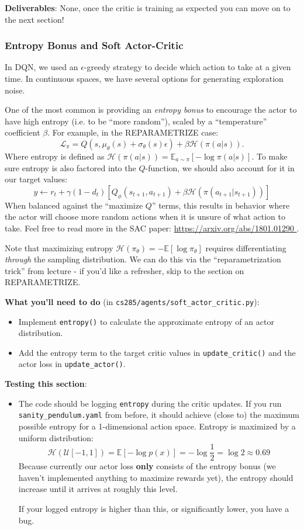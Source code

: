 \textbf{Deliverables}: None, once the critic is training as expected you can move on to the next section!

\subsubsection{Entropy Bonus and Soft Actor-Critic}
In DQN, we used an $\epsilon$-greedy strategy to decide which action to take at a given time. In continuous spaces, we have several options for generating exploration noise.

One of the most common is providing an \textit{entropy bonus} to encourage the actor to have high entropy (i.e. to be ``more random''), scaled by a ``temperature'' coefficient $\beta$. For example, in the REPARAMETRIZE case:
\[\mathcal L_\pi = Q(s, \mu_\theta(s) + \sigma_\theta(s)\epsilon) + \beta\mathcal{H}(\pi(a|s)).\]
Where entropy is defined as $\mathcal H(\pi(a|s)) = \mathbb{E}_{a \sim \pi}\left[-\log\pi(a|s)\right]$. To make sure entropy is also factored into the $Q$-function, we should also account for it in our target values:
\[y \gets r_t + \gamma(1-d_t)\left[Q_\phi(s_{t+1}, a_{t+1}) + \beta\mathcal{H}(\pi(a_{t+1}|s_{t+1}))\right]\]
When balanced against the ``maximize $Q$'' terms, this results in behavior where the actor will choose more random actions when it is unsure of what action to take.
Feel free to read more in the SAC paper: {\url{https://arxiv.org/abs/1801.01290 }}.

Note that maximizing entropy $\mathcal{H}(\pi_\theta) = -\mathbb{E}[\log \pi_\theta]$ requires differentiating \textit{through} the sampling distribution. We can do this via the ``reparametrization trick'' from lecture - if you'd like a refresher, skip to the section on REPARAMETRIZE.

\textbf{What you'll need to do} (in \verb|cs285/agents/soft_actor_critic.py|):
\begin{itemize}
    \item Implement \verb|entropy()| to calculate the approximate entropy of an actor distribution.
    \item Add the entropy term to the target critic values in \verb|update_critic()| and the actor loss in \verb|update_actor()|.
\end{itemize}

\textbf{Testing this section}:
\begin{itemize}
    \item The code should be logging \verb|entropy| during the critic updates. If you run \verb|sanity_pendulum.yaml| from before, it should achieve (close to) the maximum possible entropy for a 1-dimensional action space. Entropy is maximized by a uniform distribution:
    \[\mathcal{H}(\mathcal{U}[-1, 1]) = \mathbb{E}[-\log p(x)] = -\log \frac{1}{2} = \log 2 \approx 0.69\]
    Because currently our actor loss \textbf{only} consists of the entropy bonus (we haven't implemented anything to maximize rewards yet), the entropy should increase until it arrives at roughly this level.

    If your logged entropy is higher than this, or significantly lower, you have a bug.
\end{itemize}

